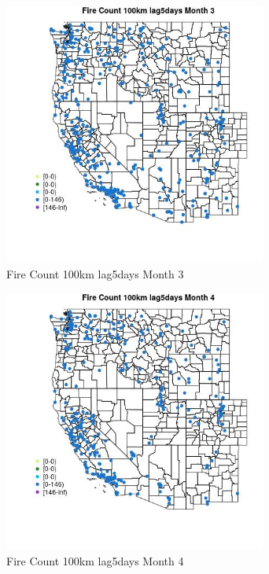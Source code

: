 \begin{figure} 
\centering  
\includegraphics[width=0.77\textwidth]{Code_Outputs/Report_ML_input_PM25_Step4_part_e_de_duplicated_aves_compiled_2019-05-18wNAs_MapObsMo3Fire_Count_100km_lag5days.jpg} 
\caption{\label{fig:Report_ML_input_PM25_Step4_part_e_de_duplicated_aves_compiled_2019-05-18wNAsMapObsMo3Fire_Count_100km_lag5days}Fire Count 100km lag5days Month 3} 
\end{figure} 
 

\begin{figure} 
\centering  
\includegraphics[width=0.77\textwidth]{Code_Outputs/Report_ML_input_PM25_Step4_part_e_de_duplicated_aves_compiled_2019-05-18wNAs_MapObsMo4Fire_Count_100km_lag5days.jpg} 
\caption{\label{fig:Report_ML_input_PM25_Step4_part_e_de_duplicated_aves_compiled_2019-05-18wNAsMapObsMo4Fire_Count_100km_lag5days}Fire Count 100km lag5days Month 4} 
\end{figure} 
 

